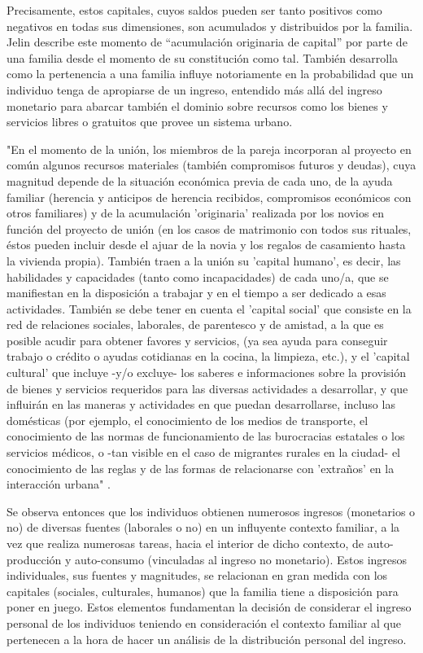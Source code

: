 Precisamente, estos capitales, cuyos saldos pueden ser tanto positivos como negativos en todas sus dimensiones, son acumulados y distribuidos por la familia. Jelin describe este momento de “acumulación originaria de capital” por parte de una familia desde el momento de su constitución como tal. También desarrolla como la pertenencia a una familia influye notoriamente en la probabilidad que un individuo tenga de apropiarse de un ingreso, entendido más allá del ingreso monetario para abarcar también el dominio sobre recursos como los bienes y servicios libres o gratuitos que provee un sistema urbano.  
	
"En el momento de la unión, los miembros de la pareja incorporan al proyecto en común algunos recursos materiales (también compromisos futuros y deudas), cuya magnitud depende de la situación económica previa de cada uno, de la ayuda familiar (herencia y anticipos de herencia recibidos, compromisos económicos con otros familiares) y de la acumulación 'originaria' realizada por los novios en función del proyecto de unión (en los casos de matrimonio con todos sus rituales, éstos pueden incluir desde el ajuar de la novia y los regalos de casamiento hasta la vivienda propia). También traen a la unión su 'capital humano', es decir, las habilidades y capacidades (tanto como incapacidades) de cada uno/a, que se manifiestan en la disposición a trabajar y en el tiempo a ser dedicado a esas actividades. También se debe tener en cuenta el 'capital social' que consiste en la red de relaciones sociales, laborales, de parentesco y de amistad, a la que es posible acudir para obtener favores y servicios, (ya sea ayuda para conseguir trabajo o crédito o ayudas cotidianas en la cocina, la limpieza, etc.), y el 'capital cultural' que incluye -y/o excluye- los saberes e informaciones sobre la provisión de bienes y servicios requeridos para las diversas actividades a desarrollar, y que influirán en las maneras y actividades en que puedan desarrollarse, incluso las domésticas (por ejemplo, el conocimiento de los medios de transporte, el conocimiento de las normas de funcionamiento de las burocracias estatales o los servicios médicos, o -tan visible en el caso de migrantes rurales en la ciudad- el conocimiento de las reglas y de las formas de relacionarse con 'extraños' en la interacción urbana" \cite[p.~96]{jelin}.
	
Se observa entonces que los individuos obtienen numerosos ingresos (monetarios o no) de diversas fuentes (laborales o no) en un influyente contexto familiar, a la vez que realiza numerosas tareas, hacia el interior de dicho contexto, de auto-producción y auto-consumo (vinculadas al ingreso no monetario). Estos ingresos individuales, sus fuentes y magnitudes, se relacionan en gran medida con los capitales (sociales, culturales, humanos) que la familia tiene a disposición para poner en juego. Estos elementos fundamentan la decisión de considerar el ingreso personal de los individuos teniendo en consideración el contexto familiar al que pertenecen a la hora de hacer un análisis de la distribución personal del ingreso.
	
